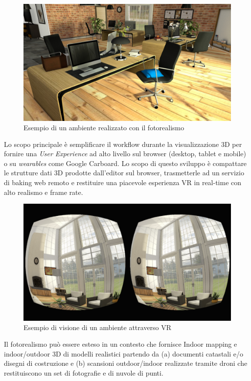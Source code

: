 \begin{figure}[htbp] %
   \centering
   \includegraphics[width=1\linewidth]{images/explorer-a-1}
   \caption{Esempio di un ambiente realizzato con il fotorealismo}
   \label{fig:revit}
   \end{figure}

Lo scopo principale \`e semplificare il workflow durante la visualizzazione 3D per fornire una \emph{User Experience}
ad alto livello sul browser (desktop, tablet e mobile) o su \emph{wearables} come Google Carboard.
\newpage
Lo scopo di questo sviluppo è compattare le strutture dati 3D prodotte dall'editor sul browser, trasmetterle ad un servizio di baking
web remoto e restituire una piacevole esperienza VR in real-time con alto realismo e frame rate.

\begin{figure}[htbp] %
   \centering
   \includegraphics[width=1\linewidth]{images/vr}
   \caption{Esempio di visione di un ambiente attraverso VR}
   \label{fig:revit}
   \end{figure}

Il fotorealismo può essere esteso in un contesto che fornisce Indoor mapping e indoor/outdoor 3D di modelli realistici
partendo da (a) documenti catastali e/o disegni di costruzione e (b) scansioni outdoor/indoor realizzate tramite droni
che restituiscono un set di fotografie e di nuvole di punti.\\
